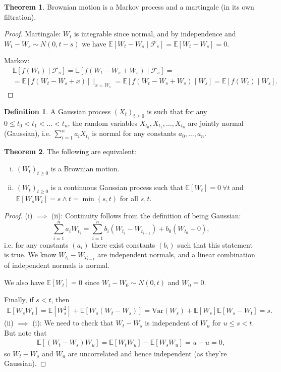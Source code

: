 \documentclass{article}
\theoremstyle{definition}
\newtheorem{theorem}{Theorem}[section]
\newtheorem{defn}{Definition}[section]
\begin{document}
\begin{theorem}
    Brownian motion is a Markov process and a martingale (in its own filtration).
\end{theorem}
\begin{proof}
    Martingale: $W_t$ is integrable since normal, and by independence and $W_t-W_s \sim N(0,t-s)$ we have $\mathbb{E}[W_t - W_s \mid \mathcal{F}_s] = \mathbb{E}[W_t-W_s]=0$.
    \vspace{1mm}
    
    Markov: 
    \begin{align*}
        &\mathbb{E}[f(W_t) \mid \mathcal{F}_s] = \mathbb{E}[f(W_t-W_s+W_s) \mid \mathcal{F}_s] = \\
        &=\mathbb{E}[f(W_t-W_s+x)]\mid_{x =W_s} = \mathbb{E}[f(W_t-W_s+W_s)\mid W_s] = \mathbb{E}[f(W_t) \mid W_s].
    \end{align*}
\end{proof}
\begin{defn}
    A Gaussian process $(X_t)_{t\ge 0}$ is such that for any $0\le t_0 < t_1 <\ldots < t_n$, the random variables $X_{t_0},X_{t_1},\ldots,X_{t_n}$ are jointly normal (Gaussian), i.e. $\sum_{i=1}^{n} a_i X_{t_i}$ is normal for any constants $a_0,\ldots,a_n$.
\end{defn}
\begin{theorem}
    The following are equivalent:
    \begin{enumerate}[(i)]
        \item $(W_t)_{t\ge 0}$ is a Brownian motion.
        \item $(W_t)_{t\ge 0}$ is a continuous Gaussian process such that $\mathbb{E}[W_t]=0 ~\forall t$ and $\mathbb{E}[W_s W_t]=s \wedge t = \min(s,t)$ for all $s,t$.
    \end{enumerate}
\end{theorem}
\begin{proof}
    (i) $\implies$ (ii): Continuity follows from the definition of being Gaussian: $$\sum_{i=1}^{n} a_i W_{t_i} = \sum_{i=1}^{n} b_i(W_{t_i}-W_{t_{i-1}}) + b_0(W_{t_0}-0),$$
    i.e. for any constants $(a_i)$ there exist constants $(b_i)$ such that this statement is true. We know $W_{t_i}-W_{T_{i-1}}$ are independent normals, and a linear combination of independent normals is normal. \vspace{1mm}
    
    We also have $\mathbb{E}[W_t]=0$ since $W_t - W_0 \sim N(0,t)$ and $W_0=0$.
    \vspace{1mm}
    
    Finally, if $s<t$, then 
    \begin{align*}
        \mathbb{E}[W_sW_t]=\mathbb{E}[W_s ^2]+\mathbb{E}[W_s(W_t-W_s)]=\text{Var}(W_s) + \mathbb{E}[W_s]\mathbb{E}[W_s-W_t]=s.
    \end{align*}
    (ii) $\implies$ (i): We need to check that $W_t-W_s$ is independent of $W_u$ for $u\le s<t$. But note that 
    \begin{align*}
        \mathbb{E}[(W_t-W_s)W_u] = \mathbb{E}[W_tW_u] - \mathbb{E}[W_sW_u]= u-u=0,
    \end{align*}
    so $W_t-W_s$ and $W_u$ are uncorrelated and hence independent (as they're Gaussian).
\end{proof}
\end{document}
